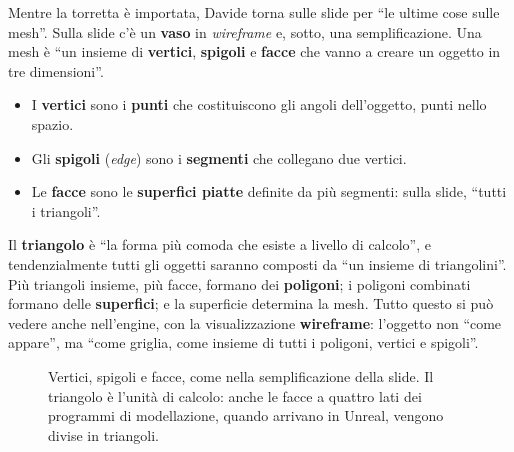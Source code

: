 Mentre la torretta è importata, Davide torna sulle slide per ``le ultime cose sulle
mesh''. Sulla slide c'è un \textbf{vaso} in \emph{wireframe} e, sotto, una
semplificazione. Una mesh è ``un insieme di \textbf{vertici}, \textbf{spigoli} e
\textbf{facce} che vanno a creare un oggetto in tre dimensioni''.
\begin{itemize}
  \item I \textbf{vertici} sono i \textbf{punti} che costituiscono gli angoli
        dell'oggetto, punti nello spazio.
  \item Gli \textbf{spigoli} (\emph{edge}) sono i \textbf{segmenti} che collegano due
        vertici.
  \item Le \textbf{facce} sono le \textbf{superfici piatte} definite da più segmenti:
        sulla slide, ``tutti i triangoli''.
\end{itemize}
Il \textbf{triangolo} è ``la forma più comoda che esiste a livello di calcolo'', e
tendenzialmente tutti gli oggetti saranno composti da ``un insieme di triangolini''. Più
triangoli insieme, più facce, formano dei \textbf{poligoni}; i poligoni combinati formano
delle \textbf{superfici}; e la superficie determina la mesh. Tutto questo si può vedere
anche nell'engine, con la visualizzazione \textbf{wireframe}: l'oggetto non ``come
appare'', ma ``come griglia, come insieme di tutti i poligoni, vertici e spigoli''.

\begin{figure}[htbp]
\centering
{}
\caption{Vertici, spigoli e facce, come nella semplificazione della slide. Il triangolo
è l'unità di calcolo: anche le facce a quattro lati dei programmi di modellazione,
quando arrivano in Unreal, vengono divise in triangoli.}
\label{ue3:fig:mesh}
\end{figure}

